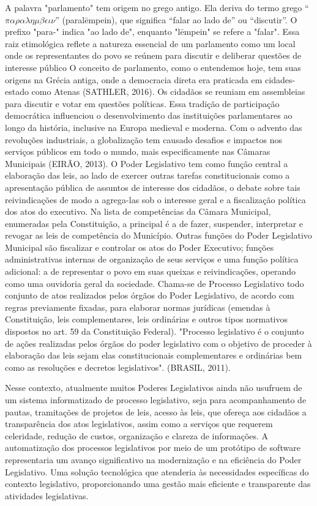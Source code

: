 \documentclass[12pt]{article}
\begin{document}
A palavra "parlamento" tem origem no grego antigo. Ela deriva do termo grego ``$\pi\alpha\rho\alpha\lambda\eta\mu\beta\epsilon\iota\nu$'' (paralēmpein), que significa ``falar ao lado de'' ou ``discutir''. O prefixo "para-" indica "ao lado de", enquanto "lēmpein" se refere a "falar". Essa raiz etimológica reflete a natureza essencial de um parlamento como um local onde os representantes do povo se reúnem para discutir e deliberar questões de interesse público O conceito de parlamento, como o entendemos hoje, tem suas origens na Grécia antiga, onde a democracia direta era praticada em cidades-estado como Atenas (SATHLER, 2016). Os cidadãos se reuniam em assembleias para discutir e votar em questões políticas. Essa tradição de participação democrática influenciou o desenvolvimento das instituições parlamentares ao longo da história, inclusive na Europa medieval e moderna. Com o advento das revoluções industriais, a globalização tem causado desafios e impactos nos serviços públicos em todo o mundo, mais especificamente nas Câmaras Municipais (EIRÃO, 2013). 
O Poder Legislativo tem como função central a elaboração das leis, ao lado de exercer outras tarefas constitucionais como a apresentação pública de assuntos de interesse dos cidadãos, o debate sobre tais reivindicações de modo a agrega-las sob o interesse geral e a fiscalização política dos atos do executivo. Na lista de competências da Câmara Municipal, enumeradas pela Constituição, a principal é a de fazer, suspender, interpretar e revogar as leis de competência do Município. Outras funções do Poder Legislativo Municipal são fiscalizar e controlar os atos do Poder Executivo; funções administrativas internas de organização de seus serviços e uma função política adicional: a de representar o povo em suas queixas e reivindicações, operando como uma ouvidoria geral da sociedade.
Chama-se de Processo Legislativo todo conjunto de atos realizados pelos órgãos do Poder Legislativo, de acordo com regras previamente fixadas, para elaborar normas jurídicas (emendas à Constituição, leis complementares, leis ordinárias e outros tipos normativos dispostos no art. 59 da Constituição Federal).  
"Processo legislativo é o conjunto de ações realizadas pelos órgãos do poder legislativo com o objetivo de proceder à elaboração das leis sejam elas constitucionais complementares e ordinárias bem como as resoluções e decretos legislativos". (BRASIL, 2011).

Nesse contexto, atualmente muitos Poderes Legislativos ainda não usufruem de um sistema informatizado de processo legislativo, seja para acompanhamento de pautas, tramitações de projetos de leis, acesso às leis, que ofereça aos cidadãos a transparência dos atos legislativos, assim como a serviços que requerem celeridade, redução de custos, organização e clareza de informações.
A automatização dos processos legislativos por meio de um protótipo de software representaria um avanço significativo na modernização e na eficiência do Poder Legislativo. Uma solução tecnológica que atenderia às necessidades específicas do contexto legislativo, proporcionando uma gestão mais eficiente e transparente das atividades legislativas.
\end{document}
